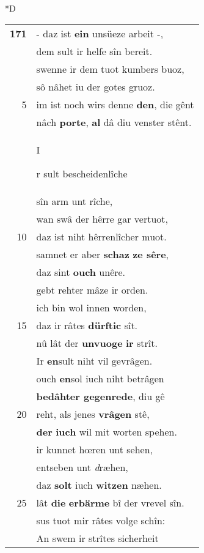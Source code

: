 \documentclass[8pt,a4paper,notitlepage]{article}
\begin{document}
\begin{table}[ht]
\begin{minipage}[t]{0.5\linewidth}
\small
\begin{center}*D
\end{center}
\begin{tabular}{rl}
\textbf{171} & - daz ist \textbf{ein} unsüeze arbeit -,\\ 
 & dem sult ir helfe sîn bereit.\\ 
 & swenne ir dem tuot kumbers buoz,\\ 
 & sô nâhet iu der gotes gruoz.\\ 
5 & im ist noch wirs denne \textbf{den}, die gênt\\ 
 & nâch \textbf{porte}, \textbf{al} dâ diu venster stênt.\\ 
 & \begin{large}I\end{large}r sult bescheidenlîche\\ 
 & sîn arm unt rîche,\\ 
 & wan swâ der hêrre gar vertuot,\\ 
10 & daz ist niht hêrrenlîcher muot.\\ 
 & samnet er aber \textbf{schaz} \textbf{ze sêre},\\ 
 & daz sint \textbf{ouch} unêre.\\ 
 & gebt rehter mâze ir orden.\\ 
 & ich bin wol innen worden,\\ 
15 & daz ir râtes \textbf{dürftic} sît.\\ 
 & nû lât der \textbf{unvuoge} \textbf{ir} strît.\\ 
 & Ir \textbf{en}sult niht vil gevrâgen.\\ 
 & ouch \textbf{en}sol iuch niht betrâgen\\ 
 & \textbf{bedâhter gegenrede}, diu gê\\ 
20 & reht, als jenes \textbf{vrâgen} stê,\\ 
 & \textbf{der} \textbf{iuch} wil mit worten spehen.\\ 
 & ir kunnet hœren unt sehen,\\ 
 & entseben unt \textit{d}ræhen,\\ 
 & daz \textbf{solt} iuch \textbf{witzen} næhen.\\ 
25 & lât \textbf{die} \textbf{erbärme} bî der vrevel sîn.\\ 
 & sus tuot mir râtes volge schîn:\\ 
 & An swem ir strîtes sicherheit\\ 

\end{tabular}
\end{minipage}
\end{table}
\end{document}
